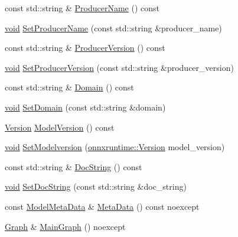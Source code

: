 \begin{DoxyCompactItemize}
const std\+::string \& \mbox{\hyperlink{classonnxruntime_1_1Model_a9c6d90551fa5943bcd70f43b84f9cb4c}{Producer\+Name}} () const
\item 
\mbox{\hyperlink{mlasi_8h_a88f941d423cb2a819b70a1358982b1a6}{void}} \mbox{\hyperlink{classonnxruntime_1_1Model_a1a2ef48c73944b335843d29214809f2a}{Set\+Producer\+Name}} (const std\+::string \&producer\+\_\+name)
\item 
const std\+::string \& \mbox{\hyperlink{classonnxruntime_1_1Model_a798ddae9a5f6322fa34e2e8b5f2bd9fe}{Producer\+Version}} () const
\item 
\mbox{\hyperlink{mlasi_8h_a88f941d423cb2a819b70a1358982b1a6}{void}} \mbox{\hyperlink{classonnxruntime_1_1Model_a5c4641b87c9285462d89a04e28e0824d}{Set\+Producer\+Version}} (const std\+::string \&producer\+\_\+version)
\item 
const std\+::string \& \mbox{\hyperlink{classonnxruntime_1_1Model_a17ae7242244056337ed571f19b54f51a}{Domain}} () const
\item 
\mbox{\hyperlink{mlasi_8h_a88f941d423cb2a819b70a1358982b1a6}{void}} \mbox{\hyperlink{classonnxruntime_1_1Model_a95c8874dfc54e6c808c2be66e19cefd2}{Set\+Domain}} (const std\+::string \&domain)
\item 
\mbox{\hyperlink{namespaceonnxruntime_ab7fae8d5830807c074def3bb8ae23cf1}{Version}} \mbox{\hyperlink{classonnxruntime_1_1Model_abbcaaa6b05f740e6a309b1bd250f2e2a}{Model\+Version}} () const
\item 
\mbox{\hyperlink{mlasi_8h_a88f941d423cb2a819b70a1358982b1a6}{void}} \mbox{\hyperlink{classonnxruntime_1_1Model_af94a49d45c75745305a1d09e70d67f79}{Set\+Modelversion}} (\mbox{\hyperlink{namespaceonnxruntime_ab7fae8d5830807c074def3bb8ae23cf1}{onnxruntime\+::\+Version}} model\+\_\+version)
\item 
const std\+::string \& \mbox{\hyperlink{classonnxruntime_1_1Model_a3255fd55fde8752cc61e1d7da47b3ee2}{Doc\+String}} () const
\item 
\mbox{\hyperlink{mlasi_8h_a88f941d423cb2a819b70a1358982b1a6}{void}} \mbox{\hyperlink{classonnxruntime_1_1Model_a5a2597f28c82e677099831245dfac50b}{Set\+Doc\+String}} (const std\+::string \&doc\+\_\+string)
\item 
const \mbox{\hyperlink{namespaceonnxruntime_a13519c21da77ccc594726b670276a266}{Model\+Meta\+Data}} \& \mbox{\hyperlink{classonnxruntime_1_1Model_a43f838a44bfe7970a114400006b54fe2}{Meta\+Data}} () const noexcept
\item 
\mbox{\hyperlink{classonnxruntime_1_1Graph}{Graph}} \& \mbox{\hyperlink{classonnxruntime_1_1Model_a3107455565d368aa674ab19cd156a433}{Main\+Graph}} () noexcept

\end{DoxyCompactItemize}
